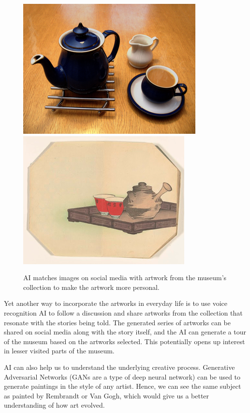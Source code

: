 \documentclass[12pt,a4paper]{report}
\begin{document}
    \begin{figure}[h]
      \centering
      \includegraphics{tea.png}
      \includegraphics{tea2.png}
      \caption{AI matches images on social media with artwork from the museum's collection to make the artwork more personal.}
      \label{ai}
    \end{figure}

  \par
    Yet another way to incorporate the artworks in everyday life is to use voice recognition AI to follow a discussion and share artworks from the collection that resonate with the stories being told. The generated series of artworks can be shared on social media along with the story itself, and the AI can generate a tour of the museum based on the artworks selected. This potentially opens up interest in lesser visited parts of the museum.

  \par
    AI can also help us to understand the underlying creative process. Generative Adversarial Networks (GANs are a type of deep neural network) can be used to generate paintings in the style of any artist. Hence, we can see the same subject as painted by Rembrandt or Van Gogh, which would give us a better understanding of how art evolved.

    \printbibliography
\end{document}
